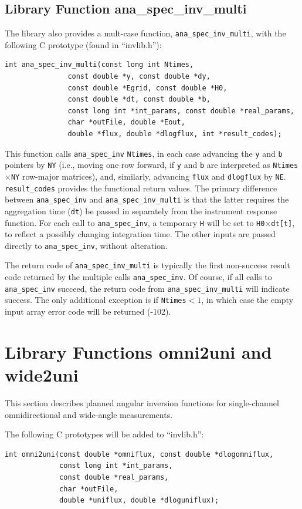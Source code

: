 \documentclass{article}    %
\begin{document}
\subsection{Library Function ana\_spec\_inv\_multi}
The library also provides a mult-case function,
\verb|ana_spec_inv_multi|, with the following C prototype (found in
``invlib.h''):
\begin{verbatim}
int ana_spec_inv_multi(const long int Ntimes,
		       const double *y, const double *dy, 
		       const double *Egrid, const double *H0, 
		       const double *dt, const double *b,
		       const long int *int_params, const double *real_params,
		       char *outFile, double *Eout, 
		       double *flux, double *dlogflux, int *result_codes);
\end{verbatim}
This function calls \verb|ana_spec_inv| \verb|Ntimes|, in each case
advancing the \verb|y| and \verb|b| pointers by \verb|NY| (i.e.,
moving one row forward, if \verb|y| and \verb|b| are interpreted as
\verb|Ntimes|$\times$\verb|NY| row-major matrices), and, similarly,
advancing \verb|flux| and \verb|dlogflux| by
\verb|NE|. \verb|result_codes| provides the functional return values.
The primary difference between \verb|ana_spec_inv| and
\verb|ana_spec_inv_multi| is that the latter requires
the aggregation time (\verb|dt|) be passed in separately from the
instrument response function. For each call to \verb|ana_spec_inv|, a
temporary \verb|H| will be set to \verb|H0|$\times$\verb|dt[t]|, to
reflect a possibly changing integration time. The other inputs
are passed directly to \verb|ana_spec_inv|, without alteration.

The return code of \verb|ana_spec_inv_multi| is typically the first
non-success result code returned by the multiple calls
\verb|ana_spec_inv|. Of course, if all calls to \verb|ana_spec_inv| succeed,
the return code from \verb|ana_spec_inv_multi| will indicate
success. The only additional exception is if \verb|Ntimes|$<1$, in
which case the empty input array error code will be returned (-102).


\section{Library Functions omni2uni and wide2uni}

This section describes planned angular inversion functions for
single-channel omnidirectional and wide-angle measurements.

The following C prototypes will be added to ``invlib.h'':
\begin{verbatim}
int omni2uni(const double *omniflux, const double *dlogomniflux,
             const long int *int_params, 
             const double *real_params,
             char *outFile, 
             double *uniflux, double *dloguniflux);
\end{verbatim}
\end{document}
